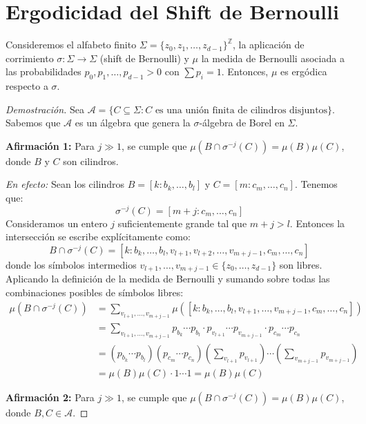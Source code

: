 \section{Ergodicidad del Shift de Bernoulli}

\begin{proposicion}
	Consideremos el alfabeto finito $\Sigma = \{z_0, z_1, \dots, z_{d-1}\}^{\mathbb{Z}}$, la aplicación de corrimiento $\sigma: \Sigma \to \Sigma$ (shift de Bernoulli) y $\mu$ la medida de Bernoulli asociada a las probabilidades $p_0, p_1, \dots, p_{d-1} > 0$ con $\sum p_i = 1$. Entonces, $\mu$ es ergódica respecto a $\sigma$.
\end{proposicion}
\begin{proof}[Demostración]
	Sea $\mathcal{A} = \{C \subseteq \Sigma : C \text{ es una unión finita de cilindros disjuntos}\}$. Sabemos que $\mathcal{A}$ es un álgebra que genera la $\sigma$-álgebra de Borel en $\Sigma$.
	
	\textbf{Afirmación 1:} Para $j \gg 1$, se cumple que $\mu(B \cap \sigma^{-j}(C)) = \mu(B)\mu(C)$, donde $B$ y $C$ son cilindros.
	
	\textit{En efecto:} Sean los cilindros $B = [k : b_k, \dots, b_l]$ y $C = [m : c_m, \dots, c_n]$. Tenemos que:
	$$ \sigma^{-j}(C) = [m+j : c_m, \dots, c_n] $$
	Consideramos un entero $j$ suficientemente grande tal que $m+j > l$. Entonces la intersección se escribe explícitamente como:
	$$ B \cap \sigma^{-j}(C) = [k : b_k, \dots, b_l, v_{l+1}, v_{l+2}, \dots, v_{m+j-1}, c_m, \dots, c_n] $$
	donde los símbolos intermedios $v_{l+1}, \dots, v_{m+j-1} \in \{z_0, \dots, z_{d-1}\}$ son libres. Aplicando la definición de la medida de Bernoulli y sumando sobre todas las combinaciones posibles de símbolos libres:
	\begin{align*}
		\mu(B \cap \sigma^{-j}(C)) &= \sum_{v_{l+1}, \dots, v_{m+j-1}} \mu([k : b_k, \dots, b_l, v_{l+1}, \dots, v_{m+j-1}, c_m, \dots, c_n]) \\
		&= \sum_{v_{l+1}, \dots, v_{m+j-1}} p_{b_k} \cdots p_{b_l} \cdot p_{v_{l+1}} \cdots p_{v_{m+j-1}} \cdot p_{c_m} \cdots p_{c_n} \\
		&= (p_{b_k} \cdots p_{b_l}) (p_{c_m} \cdots p_{c_n}) \left( \sum_{v_{l+1}} p_{v_{l+1}} \right) \cdots \left( \sum_{v_{m+j-1}} p_{v_{m+j-1}} \right) \\
		&= \mu(B)\mu(C) \cdot 1 \cdots 1 = \mu(B)\mu(C)
	\end{align*}
	
	\textbf{Afirmación 2:} Para $j \gg 1$, se cumple que $\mu(B \cap \sigma^{-j}(C)) = \mu(B)\mu(C)$, donde $B, C \in \mathcal{A}$.
	

\end{proof}
